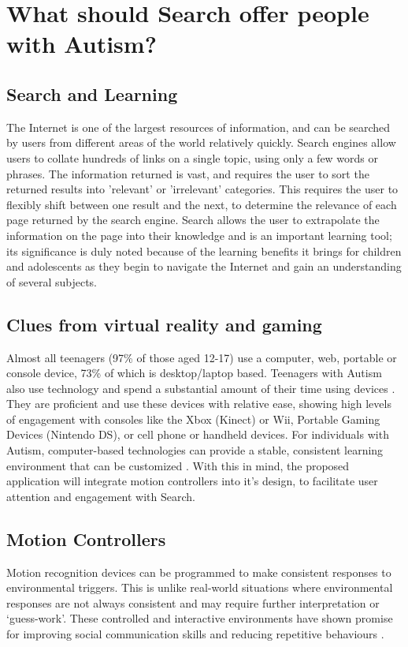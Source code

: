 \documentclass[10pt]{article}
\begin{document}
\section{What should Search offer people with Autism?}\label{What should Search offer people with Autism}
\subsection{Search and Learning}
The Internet is one of the largest resources of information, and can be searched by users from different areas of the world relatively quickly. Search engines allow users to collate hundreds of links on a single topic, using only a few words or phrases. The information returned is vast, and requires the user to sort the returned results into 'relevant' or 'irrelevant' categories. This requires the user to flexibly shift between one result and the next, to determine the relevance of each page returned by the search engine. Search allows the user to extrapolate the information on the page into their knowledge and is an important learning tool; its significance is duly noted because of the learning benefits it brings for children and adolescents as they begin to navigate the Internet and gain an understanding of several subjects. 

\subsection{Clues from virtual reality and gaming}
Almost all teenagers (97\% of those aged 12-17) use a computer, web, portable or console device, 73\% of which is desktop/laptop based. Teenagers with Autism also use technology and spend a substantial amount of their time using devices \cite{Shane and Albert}. They are proficient and use these devices with relative ease, showing high levels of engagement with consoles like the Xbox (Kinect) or Wii, Portable Gaming Devices (Nintendo DS), or cell phone or handheld devices. For individuals with Autism, computer-based technologies can provide a stable, consistent learning environment that can be customized \cite{moore}. With this in mind, the proposed application will integrate motion controllers into it's design, to facilitate user attention and engagement with Search. 

\subsection{Motion Controllers}
Motion recognition devices can be programmed to make consistent responses to environmental triggers. This is unlike real-world situations where environmental responses are not always consistent and may require further interpretation or ‘guess-work’. These controlled and interactive environments have shown promise for improving social communication skills and reducing repetitive behaviours \cite{gameshealth}.
\end{document}
